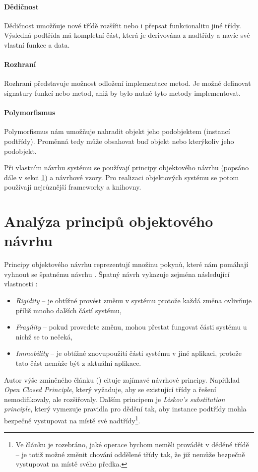 \paragraph{Dědičnost} Dědičnost umožňuje nové třídě rozšířit nebo i přepsat funkcionalitu jiné třídy. Výsledná podtřída má kompletní část, která je derivována z nadtřídy a navíc své vlastní funkce a data.
\paragraph{Rozhraní} Rozhraní představuje možnost odložení implementace metod. Je možné definovat signatury funkcí nebo metod, aniž by bylo nutné tyto metody implementovat.
\paragraph{Polymorfismus} Polymorfismus nám umožňuje nahradit objekt jeho podobjektem (instancí podtřídy). Proměnná tedy může obsahovat buď objekt nebo kterýkoliv jeho podobjekt.

Při vlastním návrhu systému se používají principy objektového návrhu (popsáno dále v sekci \ref{analysis-oop_design_principles}) a návrhové vzory. Pro realizaci objektových systému se potom používají nejrůznější frameworky a knihovny.

\section{Analýza principů objektového návrhu}
\label{analysis-oop_design_principles}

Principy objektového návrhu reprezentují množinu pokynů, které nám pomáhají vyhnout se špatnému návrhu \cite{oop_design_principles}. Špatný návrh vykazuje zejména následující vlastnosti \cite{oop_design_principles_and_patterns}:

\begin{itemize}
\item \emph{Rigidity} -- je obtížné provést změnu v systému protože každá změna ovlivňuje příliš mnoho dalších částí systému,
\item \emph{Fragility} -- pokud provedete změnu, mohou přestat fungovat části systému u nichž se to nečeká,
\item \emph{Immobility} -- je obtížné znovupoužití části systému v jiné aplikaci, protože tato část nemůže být  z aktuální aplikace.
\end{itemize}

Autor výše zmíněného článku (\cite{oop_design_principles_and_patterns}) cituje zajímavé návrhové principy. Například \emph{Open Closed Principle}, který vyžaduje, aby se existující třídy a řešení nemodifikovaly, ale rozšiřovaly. Dalším principem je \emph{Liskov's substitution principle}, který vymezuje pravidla pro dědění tak, aby instance podtřídy mohla bezpečně vystupovat na místě své nadtřídy\footnote{Ve článku je rozebráno, jaké operace bychom neměli provádět v děděné třídě -- je totiž možné změnit chování oddělené třídy tak, že již nemůže bezpečně vystupovat na místě svého předka.}.

